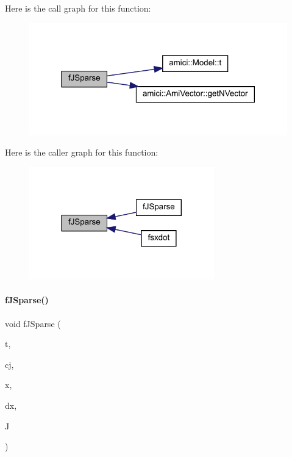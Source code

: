 Here is the call graph for this function\+:
\nopagebreak
\begin{figure}[H]
\begin{center}
\leavevmode
\includegraphics[width=317pt]{classamici_1_1_model___d_a_e_a3147c7a327fead438efe714f04491c82_cgraph}
\end{center}
\end{figure}
Here is the caller graph for this function\+:
\nopagebreak
\begin{figure}[H]
\begin{center}
\leavevmode
\includegraphics[width=227pt]{classamici_1_1_model___d_a_e_a3147c7a327fead438efe714f04491c82_icgraph}
\end{center}
\end{figure}
\mbox{\label{classamici_1_1_model___d_a_e_acb8703eaab2bd0da229453af1e6f71e3}} 
\paragraph{\texorpdfstring{f\+J\+Sparse()}{fJSparse()}\hspace{0.1cm}{\footnotesize\ttfamily [2/3]}}
{\footnotesize\ttfamily void f\+J\+Sparse (\begin{DoxyParamCaption}\item[{\mbox{\hyperlink{namespaceamici_a1bdce28051d6a53868f7ccbf5f2c14a3}{realtype}}}]{t,  }\item[{\mbox{\hyperlink{namespaceamici_a1bdce28051d6a53868f7ccbf5f2c14a3}{realtype}}}]{cj,  }\item[{N\+\_\+\+Vector}]{x,  }\item[{N\+\_\+\+Vector}]{dx,  }\item[{Sls\+Mat}]{J }\end{DoxyParamCaption})}

